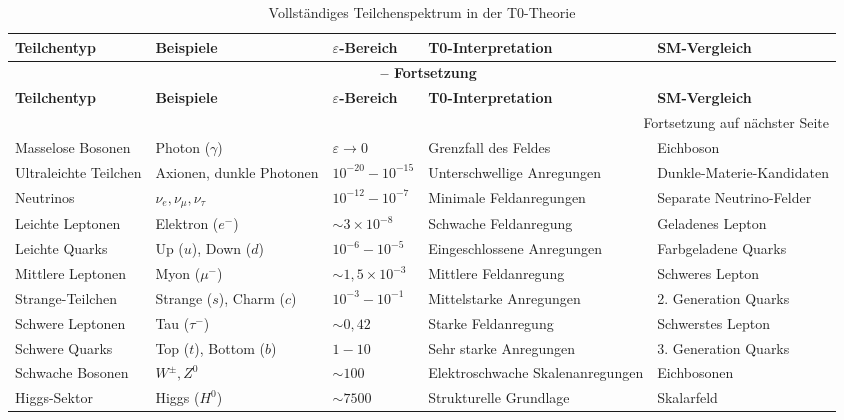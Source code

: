 \documentclass[12pt,a4paper]{article}
\begin{document}
	\begin{longtable}{|p{3cm}|p{}|p{}|p{}|p{3cm}|}
		\caption{Vollständiges Teilchenspektrum in der T0-Theorie} \\
		\hline
		\textbf{Teilchentyp} & \textbf{Beispiele} & \textbf{$\varepsilon$-Bereich} & \textbf{T0-Interpretation} & \textbf{SM-Vergleich} \\
		\hline
		\endfirsthead
		
		\multicolumn{5}{c}{{\bfseries \tablename\ \thetable{} -- Fortsetzung}} \\
		\hline
		\textbf{Teilchentyp} & \textbf{Beispiele} & \textbf{$\varepsilon$-Bereich} & \textbf{T0-Interpretation} & \textbf{SM-Vergleich} \\
		\hline
		\endhead
		
		\hline
		\multicolumn{5}{r}{{Fortsetzung auf nächster Seite}} \\
		\endfoot
		
		\hline
		\endlastfoot
		
		Masselose Bosonen & Photon ($\gamma$) & $\varepsilon \to 0$ & Grenzfall des Feldes & Eichboson \\
		\hline
		Ultraleichte Teilchen & Axionen, dunkle Photonen & $10^{-20} - 10^{-15}$ & Unterschwellige Anregungen & Dunkle-Materie-Kandidaten \\
		\hline
		Neutrinos & $\nu_e, \nu_\mu, \nu_\tau$ & $10^{-12} - 10^{-7}$ & Minimale Feldanregungen & Separate Neutrino-Felder \\
		\hline
		Leichte Leptonen & Elektron ($e^-$) & $\sim 3 \times 10^{-8}$ & Schwache Feldanregung & Geladenes Lepton \\
		\hline
		Leichte Quarks & Up ($u$), Down ($d$) & $10^{-6} - 10^{-5}$ & Eingeschlossene Anregungen & Farbgeladene Quarks \\
		\hline
		Mittlere Leptonen & Myon ($\mu^-$) & $\sim 1{,}5 \times 10^{-3}$ & Mittlere Feldanregung & Schweres Lepton \\
		\hline
		Strange-Teilchen & Strange ($s$), Charm ($c$) & $10^{-3} - 10^{-1}$ & Mittelstarke Anregungen & 2. Generation Quarks \\
		\hline
		Schwere Leptonen & Tau ($\tau^-$) & $\sim 0{,}42$ & Starke Feldanregung & Schwerstes Lepton \\
		\hline
		Schwere Quarks & Top ($t$), Bottom ($b$) & $1 - 10$ & Sehr starke Anregungen & 3. Generation Quarks \\
		\hline
		Schwache Bosonen & $W^{\pm}, Z^0$ & $\sim 100$ & Elektroschwache Skalenanregungen & Eichbosonen \\
		\hline
		Higgs-Sektor & Higgs ($H^0$) & $\sim 7500$ & Strukturelle Grundlage & Skalarfeld \\
		\hline
	\end{longtable}
	
\end{document}
